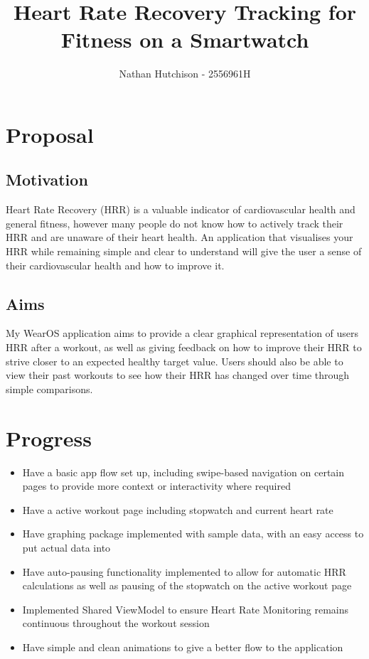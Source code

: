 \documentclass[11pt]{article}
\title{ {{Heart Rate Recovery Tracking for Fitness on a Smartwatch}} }
\author{ {{Nathan Hutchison}} - {{2556961H}} }
\begin{document}
\maketitle
     

\section{Proposal}\label{proposal}

\subsection{Motivation}\label{motivation}

Heart Rate Recovery (HRR) is a valuable indicator of cardiovascular health and general fitness, however many people do not know how to actively track their HRR and are unaware of their heart health. An application that visualises your HRR while remaining simple and clear to understand will give the user a sense of their cardiovascular health and how to improve it.

\subsection{Aims}\label{aims}

My WearOS application aims to provide a clear graphical representation of users HRR after a workout, as well as giving feedback on how to improve their HRR to strive closer to an expected healthy target value. Users should also be able to view their past workouts to see how their HRR has changed over time through simple comparisons.

\section{Progress}\label{progress}

\begin{itemize}
    \item Have a basic app flow set up, including swipe-based navigation on certain pages to provide more context or interactivity where required
    \item Have a active workout page including stopwatch and current heart rate
    \item Have graphing package implemented with sample data, with an easy access to put actual data into
    \item Have auto-pausing functionality implemented to allow for automatic HRR calculations as well as pausing of the stopwatch on the active workout page
    \item Implemented Shared ViewModel to ensure Heart Rate Monitoring remains continuous throughout the workout session
    \item Have simple and clean animations to give a better flow to the application
\end{itemize}
\end{document}
